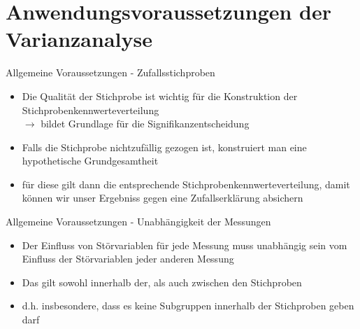 \documentclass{beamer}
\begin{document}
	\section{Anwendungsvoraussetzungen der Varianzanalyse}
	
	\begin{frame}{Allgemeine Voraussetzungen - Zufallsstichproben}
		\begin{itemize}
			\item Die Qualität der Stichprobe ist wichtig für die Konstruktion der Stichprobenkennwerteverteilung \\
			 $\rightarrow$ bildet Grundlage für die Signifikanzentscheidung
			\item Falls die Stichprobe nichtzufällig gezogen ist, konstruiert man eine hypothetische Grundgesamtheit 
			\item für diese gilt dann die entsprechende Stichprobenkennwerteverteilung, damit können wir unser Ergebniss gegen eine Zufallserklärung absichern
		\end{itemize}
	\end{frame}
	
	\begin{frame}{Allgemeine Voraussetzungen - Unabhängigkeit der Messungen}
		\begin{itemize}
			\item Der Einfluss von Störvariablen für jede Messung muss unabhängig sein vom Einfluss der Störvariablen jeder anderen Messung
			\item Das gilt sowohl innerhalb der, als auch zwischen den Stichproben 
			\item d.h. insbesondere, dass es keine Subgruppen innerhalb der Stichproben geben darf
		\end{itemize}
	\end{frame}
	
\end{document}
